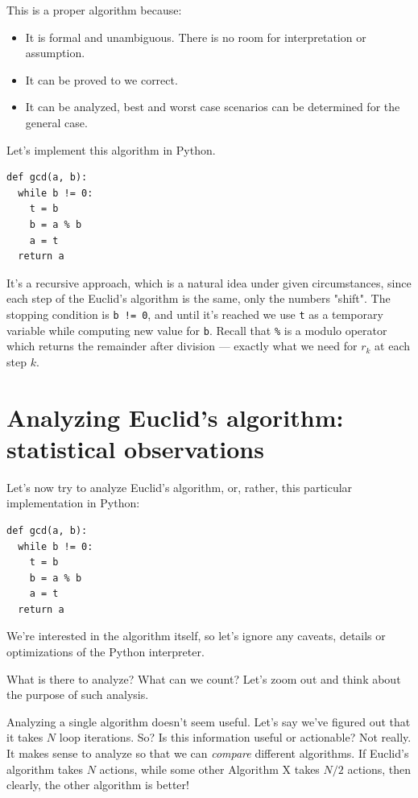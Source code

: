 \documentclass[a4paper, justified, notitlepage, sfsidenotes, notoc]{tufte-book}
\begin{document}
This is a proper algorithm because:
\begin{itemize}
\item It is formal and unambiguous. There is no room for interpretation or assumption.
\item It can be proved to we correct.
\item It can be analyzed, best and worst case scenarios can be determined for the general case.
\end{itemize}

Let's implement this algorithm in Python.

\begin{verbatim}
def gcd(a, b):
  while b != 0:
    t = b
    b = a % b
    a = t
  return a
\end{verbatim}

It's a recursive approach, which is a natural idea under given circumstances, since each step of the Euclid's algorithm is the same, only the numbers "shift". The stopping condition is \texttt{b != 0}, and until it's reached we use \texttt{t} as a temporary variable while computing new value for \texttt{b}. Recall that \texttt{\%} is a modulo operator which returns the remainder after division — exactly what we need for \(r_{k}\) at each step \(k\).
\chapter{Analyzing Euclid's algorithm: statistical observations}
\label{sec:org9d82481}

Let's now try to analyze Euclid's algorithm, or, rather, this particular implementation in Python:

\begin{verbatim}
def gcd(a, b):
  while b != 0:
    t = b
    b = a % b
    a = t
  return a
\end{verbatim}

We're interested in the algorithm itself, so let's ignore any caveats, details or optimizations of the Python interpreter.

What is there to analyze? What can we count? Let's zoom out and think about the purpose of such analysis.

Analyzing a single algorithm doesn't seem useful. Let's say we've figured out that it takes \(N\) loop iterations. So? Is this information useful or actionable? Not really. It makes sense to analyze so that we can \emph{compare} different algorithms. If Euclid's algorithm takes \(N\) actions, while some other Algorithm X takes \(N/2\) actions, then clearly, the other algorithm is better!
\end{document}
